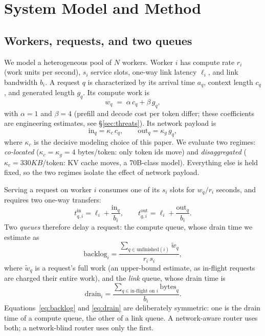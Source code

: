 \section{System Model and Method}
\label{sec:model}

\subsection{Workers, requests, and two queues}
We model a heterogeneous pool of $N$ workers. Worker $i$ has compute rate $r_i$ (work units per
second), $s_i$ service slots, one-way link latency $\ell_i$, and link bandwidth $b_i$. A request
$q$ is characterized by its arrival time $a_q$, context length $c_q$, and generated length $g_q$.
Its compute work is
\begin{equation}
  w_q \;=\; \alpha\, c_q + \beta\, g_q ,
  \label{eq:work}
\end{equation}
with $\alpha=1$ and $\beta=4$ (prefill and decode cost per token differ; these coefficients are
engineering estimates, see \S\ref{sec:threats}). Its network payload is
\begin{equation}
  \text{in}_q = \kappa_c\, c_q, \qquad \text{out}_q = \kappa_g\, g_q ,
  \label{eq:bytes}
\end{equation}
where $\kappa_c$ is the decisive modeling choice of this paper. We evaluate two regimes:
\emph{co-located} ($\kappa_c=\kappa_g=4$ bytes/token: only token ids move) and
\emph{disaggregated} ($\kappa_c=330 KB$/token: KV cache moves, a 70B-class model).
Everything else is held fixed, so the two regimes isolate the effect of network payload.

Serving a request on worker $i$ consumes one of its $s_i$ slots for $w_q/r_i$ seconds, and
requires two one-way transfers:
\begin{equation}
  t^{\text{in}}_{q,i} = \ell_i + \frac{\text{in}_q}{b_i}, \qquad
  t^{\text{out}}_{q,i} = \ell_i + \frac{\text{out}_q}{b_i}.
  \label{eq:net}
\end{equation}
Two \emph{queues} therefore delay a request: the compute queue, whose drain time we estimate as
\begin{equation}
  \text{backlog}_i = \frac{\sum_{q \in \text{unfinished}(i)} \tilde w_q}{r_i\, s_i},
  \label{eq:backlog}
\end{equation}
where $\tilde w_q$ is a request's full work (an upper-bound estimate, as in-flight requests are
charged their entire work), and the \emph{link} queue, whose drain time is
\begin{equation}
  \text{drain}_i = \frac{\sum_{q \in \text{in-flight on } i} \text{bytes}_q}{b_i}.
  \label{eq:drain}
\end{equation}
Equations~\eqref{eq:backlog} and \eqref{eq:drain} are deliberately symmetric: one is the drain
time of a compute queue, the other of a link queue. A network-aware router uses both; a
network-blind router uses only the first.

